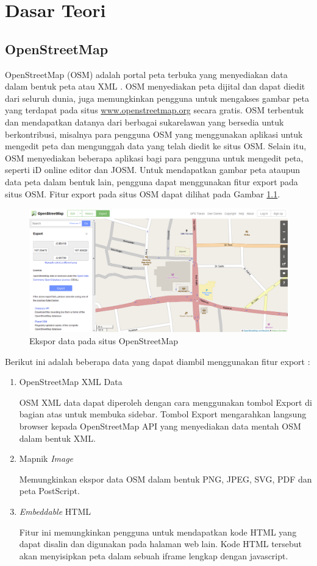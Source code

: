 \chapter{Dasar Teori}
\section{OpenStreetMap}
OpenStreetMap (OSM) adalah portal peta terbuka yang menyediakan data dalam
bentuk peta atau XML \cite{osm}. OSM menyediakan peta dijital dan dapat diedit dari seluruh dunia, juga memungkinkan pengguna untuk mengakses gambar peta yang terdapat pada
situs \url{www.openstreetmap.org} secara gratis. OSM terbentuk dan mendapatkan
datanya dari berbagai sukarelawan yang bersedia untuk berkontribusi, misalnya para pengguna OSM yang menggunakan aplikasi untuk 
mengedit peta dan mengunggah data yang telah diedit ke situs OSM. Selain itu, OSM menyediakan 
beberapa aplikasi bagi para pengguna untuk mengedit peta, seperti iD online editor dan JOSM. 
Untuk mendapatkan gambar peta ataupun data peta dalam bentuk lain, pengguna dapat menggunakan 
fitur export pada situs OSM. Fitur export pada situs OSM dapat
dilihat pada Gambar \ref{fig:export_osm}.
\begin{figure}[h]
\centering
\includegraphics[scale=0.4]{Gambar/export_osm}
\caption[Ekspor data pada situs OpenStreetMap]{Ekspor data pada situs
OpenStreetMap}
\label{fig:export_osm}
\end{figure}

Berikut ini adalah beberapa data yang dapat diambil menggunakan fitur export
\cite{osm}:
\begin{enumerate}
\item OpenStreetMap XML Data

OSM XML data dapat diperoleh dengan cara menggunakan tombol Export di bagian atas untuk 
membuka sidebar. Tombol Export mengarahkan langsung browser kepada OpenStreetMap API yang 
menyediakan data mentah OSM dalam bentuk XML.

\item Mapnik \textit{Image} 

Memungkinkan ekspor data OSM dalam bentuk PNG, JPEG, SVG, PDF dan peta PostScript.

\item \textit{Embeddable} HTML

Fitur ini memungkinkan pengguna untuk mendapatkan kode HTML yang dapat disalin dan digunakan pada halaman web lain. Kode HTML tersebut akan menyisipkan peta dalam sebuah iframe lengkap dengan javascript.
\end{enumerate}

